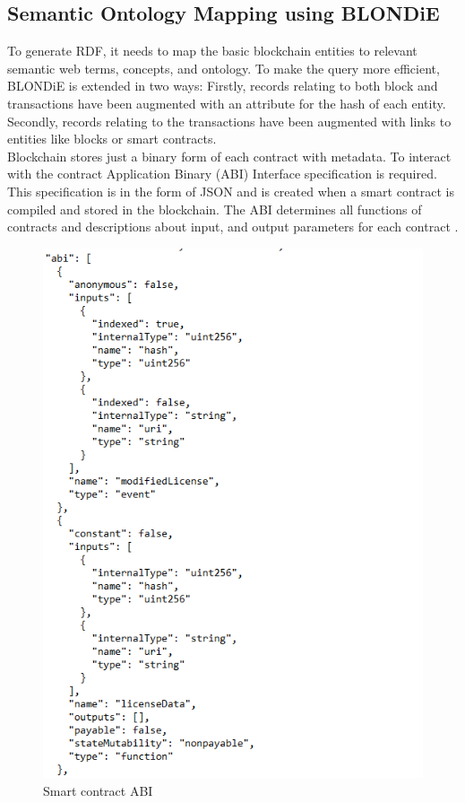 \subsection{Semantic Ontology Mapping using BLONDiE} 
To generate RDF, it needs to map the basic blockchain entities to relevant semantic web terms, concepts, and ontology. To make the query more efficient, BLONDiE is extended in two ways: Firstly, records relating to both block and transactions have been
augmented with an attribute for the hash of each entity. Secondly, records relating to the transactions have been augmented with links to entities like blocks or smart contracts.\\
Blockchain stores just a binary form of each contract with metadata.   
To interact with the contract Application Binary (ABI) Interface specification is required. This specification is in the form of JSON and is created when a smart contract is compiled and stored in the blockchain. The ABI determines all functions of contracts and descriptions about input, and output parameters for each contract \cite{Third}.

\begin{center}
	\begin{figure}[htb!]
		
		\begin{minipage}{0.45\linewidth}
			\centering
			\includegraphics[width=1.95\textwidth]{images/chap02_SmartContract_ABI.png}
		\end{minipage}
		\caption[Smart contract ABI]{Smart contract ABI}
		
	\end{figure}
	
\end{center}
